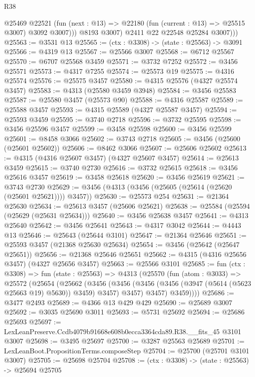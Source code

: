 \begin{lexlean}{R38}
\begin{coremodule}
                @25469
                @22521
                (fun (next : @13) => @22180 (fun (current : @13) => @25515 @3007) @3092 @3007)))
            @8193
            @3007)
          @2411
          @22
          @22548
          @25284
          @3007)))
@25563 := @3531 @13
@25565 := (ctx : @3308) -> (state : @25563) -> @3091
@25566 := @4319 @13
@25567 := @25566 @3007
@25568 := @6712 @25567
@25570 := @6707 @25568 @3459
@25571 := @3732 @7252
@25572 := @3456 @25571
@25573 := @4317 @7255
@25574 := @25573 @19
@25575 := @4316 @25574
@25576 := @25575 @3457
@25580 := @4315 @25576 (@4327 @25574 @3457)
@25583 := @4313 (@25580 @3459 @3948)
@25584 := @3456 @25583
@25587 := @25580 @3457 (@25573 @90)
@25588 := @4316 @25587
@25589 := @25588 @3457
@25593 := @4315 @25589 (@4327 @25587 @3457)
@25594 := @25593 @3459
@25595 := @3740 @2718
@25596 := @3732 @25595
@25598 := @3456 @25596 @3457
@25599 := @3458 @25598
@25600 := @3456 @25599
@25601 := @8458 @3066
@25602 := @3743 @2718
@25605 := @3456 (@25600 (@25601 @25602))
@25606 := @8462 @3066
@25607 := @25606 @25602
@25613 := @4315 (@4316 @25607 @3457) (@4327 @25607 @3457)
@25614 := @25613 @3459
@25615 := @3740 @2730
@25616 := @3732 @25615
@25618 := @3456 @25616 @3457
@25619 := @3458 @25618
@25620 := @3456 @25619
@25621 := @3743 @2730
@25629 := @3456 (@4313 (@3456 (@25605 (@25614 (@25620 (@25601 @25621)))) @3457))
@25630 := @25573 @254
@25631 := @21364 @25630
@25634 := @25613 @3457 (@25606 @25621)
@25638 := @25584 (@25594 (@25629 (@25631 @25634)))
@25640 := @3456 @25638 @3457
@25641 := @4313 @25640
@25642 := @3456 @25641
@25643 := @4317 @3042
@25644 := @4443 @13
@25646 := @25643 (@25644 @3101)
@25647 := @21364 @25646
@25651 := @25593 @3457 (@21368 @25630 @25634)
@25654 := @3456 (@25642 (@25647 @25651))
@25656 := @21368 @25646 @25651
@25662 := @4315 (@4316 @25656 @3457) (@4327 @25656 @3457)
@25663 := @25566 @3101
@25685 := fun (ctx : @3308) =>
  fun (state : @25563) =>
  @4313
    (@25570
      (fun (atom : @3033) =>
      @25572
        (@25654
          (@25662
            (@3456
              (@3456 (@3456 (@3456 (@3947 (@5614 (@5623 @25663 @19) @5630)) @3459) @3457) @3457)
              @3457)
            @3459))))
@25686 := @3477 @2493
@25689 := @4366 @13 @429 @429
@25690 := @25689 @3007
@25692 := @3035 @25690 @3011
@25693 := @5731 @25692
@25694 := @25686 @25693
@25697 := LexLeanPreserve.Ccdb4079b91668e608b0ecca3364cda89.R38.__fits_45 @3101 @3007
@25698 := @3495 @25697
@25700 := @3287 @25563 @25689
@25701 := LexLeanBoot.PropositionTerms.composeStep
@25704 := @25700 (@25701 @3101 @3007)
@25705 := @25698 @25704
@25708 := (ctx : @3308) -> (state : @25563) -> @25694 @25705

\end{coremodule}
\end{lexlean}
